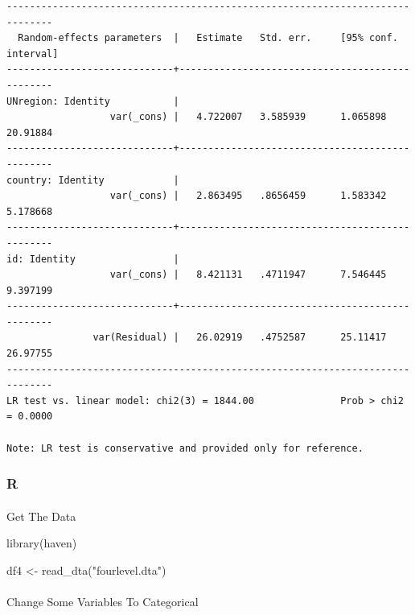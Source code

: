 \documentclass[
  letterpaper,
  DIV=11,
  numbers=noendperiod]{scrreprt}
\makeatletter
\let\oldparagraph\paragraph
\renewcommand{\paragraph}{
    \@ifstar
      \xxxParagraphStar
      \xxxParagraphNoStar
  }
\newcommand{\xxxParagraphStar}[1]{\oldparagraph*{#1}\mbox{}}
\newcommand{\xxxParagraphNoStar}[1]{\oldparagraph{#1}\mbox{}}
\newenvironment{Shaded}{\begin{snugshade}}{\end{snugshade}}
\newcommand{\FunctionTok}[1]{\textcolor[rgb]{0.28,0.35,0.67}{#1}}
\newcommand{\NormalTok}[1]{\textcolor[rgb]{0.00,0.23,0.31}{#1}}
\newcommand{\OtherTok}[1]{\textcolor[rgb]{0.00,0.23,0.31}{#1}}
\newcommand{\SpecialCharTok}[1]{\textcolor[rgb]{0.37,0.37,0.37}{#1}}
\newcommand{\StringTok}[1]{\textcolor[rgb]{0.13,0.47,0.30}{#1}}
\makeatother
\begin{document}
\begin{verbatim}
------------------------------------------------------------------------------
  Random-effects parameters  |   Estimate   Std. err.     [95% conf. interval]
-----------------------------+------------------------------------------------
UNregion: Identity           |
                  var(_cons) |   4.722007   3.585939      1.065898    20.91884
-----------------------------+------------------------------------------------
country: Identity            |
                  var(_cons) |   2.863495   .8656459      1.583342    5.178668
-----------------------------+------------------------------------------------
id: Identity                 |
                  var(_cons) |   8.421131   .4711947      7.546445    9.397199
-----------------------------+------------------------------------------------
               var(Residual) |   26.02919   .4752587      25.11417    26.97755
------------------------------------------------------------------------------
LR test vs. linear model: chi2(3) = 1844.00               Prob > chi2 = 0.0000

Note: LR test is conservative and provided only for reference.
\end{verbatim}

\subsubsection{R}

\paragraph{Get The Data}\label{get-the-data-9}

\begin{Shaded}
\begin{Highlighting}[]
\FunctionTok{library}\NormalTok{(haven)}

\NormalTok{df4 }\OtherTok{\textless{}{-}} \FunctionTok{read\_dta}\NormalTok{(}\StringTok{"fourlevel.dta"}\NormalTok{)}
\end{Highlighting}
\end{Shaded}

\paragraph{Change Some Variables To
Categorical}\label{change-some-variables-to-categorical-5}

\begin{Shaded}
\end{Shaded}
\end{document}
